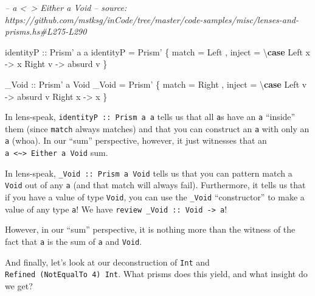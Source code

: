 \documentclass[]{article}
\newenvironment{Shaded}{}{}
\newcommand{\CommentTok}[1]{\textcolor[rgb]{0.38,0.63,0.69}{\textit{#1}}}
\newcommand{\DataTypeTok}[1]{\textcolor[rgb]{0.56,0.13,0.00}{#1}}
\newcommand{\FunctionTok}[1]{\textcolor[rgb]{0.02,0.16,0.49}{#1}}
\newcommand{\KeywordTok}[1]{\textcolor[rgb]{0.00,0.44,0.13}{\textbf{#1}}}
\newcommand{\NormalTok}[1]{#1}
\newcommand{\OtherTok}[1]{\textcolor[rgb]{0.00,0.44,0.13}{#1}}
\begin{document}
\begin{Shaded}
\begin{Highlighting}[]
\CommentTok{-- a <~> Either a Void}
\CommentTok{-- source: https://github.com/mstksg/inCode/tree/master/code-samples/misc/lenses-and-prisms.hs#L275-L290}

\OtherTok{identityP ::} \DataTypeTok{Prism'}\NormalTok{ a a}
\NormalTok{identityP }\FunctionTok{=} \DataTypeTok{Prism'}
\NormalTok{    \{ match }\FunctionTok{=} \DataTypeTok{Left}
\NormalTok{    , inject }\FunctionTok{=}\NormalTok{ \textbackslash{}}\KeywordTok{case}
        \DataTypeTok{Left}\NormalTok{  x }\OtherTok{->}\NormalTok{ x}
        \DataTypeTok{Right}\NormalTok{ v }\OtherTok{->}\NormalTok{ absurd v}
\NormalTok{    \}}

\OtherTok{_Void ::} \DataTypeTok{Prism'}\NormalTok{ a }\DataTypeTok{Void}
\NormalTok{_Void }\FunctionTok{=} \DataTypeTok{Prism'}
\NormalTok{    \{ match }\FunctionTok{=} \DataTypeTok{Right}
\NormalTok{    , inject }\FunctionTok{=}\NormalTok{ \textbackslash{}}\KeywordTok{case}
        \DataTypeTok{Left}\NormalTok{  v }\OtherTok{->}\NormalTok{ absurd v}
        \DataTypeTok{Right}\NormalTok{ x }\OtherTok{->}\NormalTok{ x}
\NormalTok{    \}}
\end{Highlighting}
\end{Shaded}

In lens-speak, \texttt{identityP\ ::\ Prism\textquotesingle{}\ a\ a} tells us
that all \texttt{a}s have an \texttt{a} ``inside'' them (since \texttt{match}
always matches) and that you can construct an \texttt{a} with only an \texttt{a}
(whoa). In our ``sum'' perspective, however, it just witnesses that an
\texttt{a\ \textless{}\textasciitilde{}\textgreater{}\ Either\ a\ Void} sum.

In lens-speak, \texttt{\_Void\ ::\ Prism\textquotesingle{}\ a\ Void} tells us
that you can pattern match a \texttt{Void} out of any \texttt{a} (and that match
will always fail). Furthermore, it tells us that if you have a value of type
\texttt{Void}, you can use the \texttt{\_Void} ``constructor'' to make a value
of any type \texttt{a}! We have
\texttt{review\ \_Void\ ::\ Void\ -\textgreater{}\ a}!

However, in our ``sum'' perspective, it is nothing more than the witness of the
fact that \texttt{a} is the sum of \texttt{a} and \texttt{Void}.

And finally, let's look at our deconstruction of \texttt{Int} and
\texttt{Refined\ (NotEqualTo\ 4)\ Int}. What prisms does this yield, and what
insight do we get?
\end{document}
